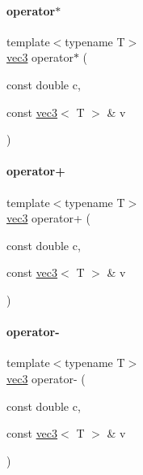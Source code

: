 \paragraph{\texorpdfstring{operator$\ast$}{operator*}}
{\footnotesize\ttfamily template$<$typename T$>$ \\
\mbox{\hyperlink{structvec3}{vec3}} operator$\ast$ (\begin{DoxyParamCaption}\item[{const double}]{c,  }\item[{const \mbox{\hyperlink{structvec3}{vec3}}$<$ T $>$ \&}]{v }\end{DoxyParamCaption})\hspace{0.3cm}{\ttfamily [friend]}}

\mbox{\label{structvec3_a5a4f97c459eb49bb2e18ed9f0e486114}} 
\paragraph{\texorpdfstring{operator+}{operator+}}
{\footnotesize\ttfamily template$<$typename T$>$ \\
\mbox{\hyperlink{structvec3}{vec3}} operator+ (\begin{DoxyParamCaption}\item[{const double}]{c,  }\item[{const \mbox{\hyperlink{structvec3}{vec3}}$<$ T $>$ \&}]{v }\end{DoxyParamCaption})\hspace{0.3cm}{\ttfamily [friend]}}

\mbox{\label{structvec3_a3daa3a334acdaef0cebfb9cb8b7c2992}} 
\paragraph{\texorpdfstring{operator-\/}{operator-}}
{\footnotesize\ttfamily template$<$typename T$>$ \\
\mbox{\hyperlink{structvec3}{vec3}} operator-\/ (\begin{DoxyParamCaption}\item[{const double}]{c,  }\item[{const \mbox{\hyperlink{structvec3}{vec3}}$<$ T $>$ \&}]{v }\end{DoxyParamCaption})\hspace{0.3cm}{\ttfamily [friend]}}

